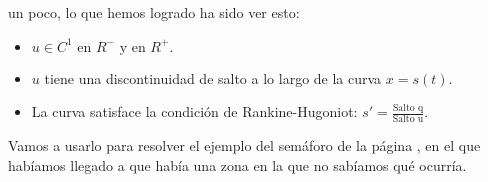 			 un poco, lo que hemos logrado ha sido ver esto:

			\begin{itemize}[itemsep = 1pt]
				\item $ u \in C^1 \text{ en } R^{-} \text{ y en } R^{+}. $
				\item $u$ tiene una discontinuidad de salto a lo largo de la curva $x = s(t)$.
				\item La curva satisface la condición de Rankine-Hugoniot: $s' = \frac{\text{Salto q}}{\text{Salto u}}$.
			\end{itemize}

			Vamos a usarlo para resolver el ejemplo del semáforo de la página \pageref{ejm:Semaforo}, en el que habíamos llegado a que había una zona en la que no sabíamos qué ocurría.

